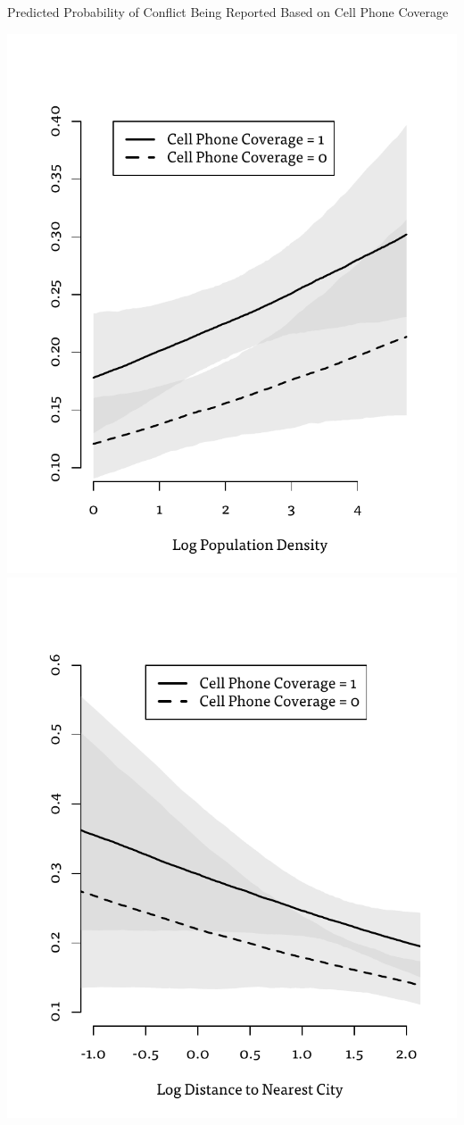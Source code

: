 \documentclass[article,36pt,extrafontsizes,oneside,openany,oldfontcommands]{memoir}
\begin{document}
\begin{adjmulticols*}{3}{0.5in}{0.5in}
\vspace{-1.8in}
\begin{center}
\small
Predicted Probability of Conflict Being Reported Based on Cell Phone Coverage
\end{center}
\vspace{-.5in}
\includegraphics[width=.5\linewidth]{popu.pdf}
\includegraphics[width=.5\linewidth]{dist.pdf}







\end{adjmulticols*}
\end{document}
